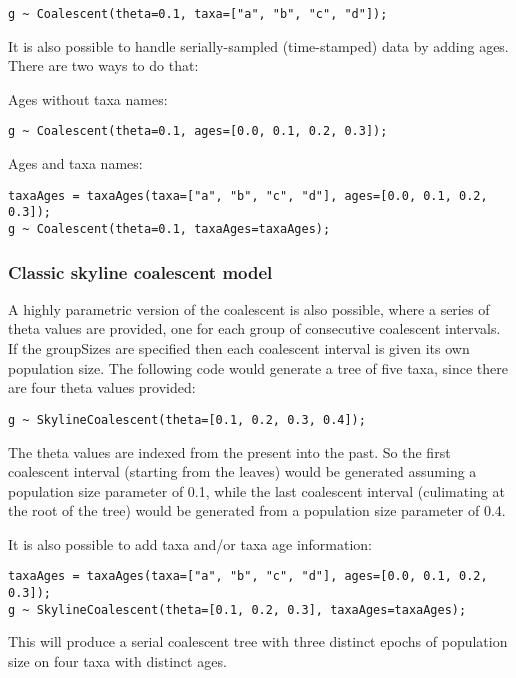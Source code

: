 \documentclass[oneside]{article}
\begin{document}
\begin{verbatim}
g ~ Coalescent(theta=0.1, taxa=["a", "b", "c", "d"]);
\end{verbatim}

It is also possible to handle serially-sampled (time-stamped) data by
adding ages.
There are two ways to do that: 

Ages without taxa names:

\begin{verbatim}
g ~ Coalescent(theta=0.1, ages=[0.0, 0.1, 0.2, 0.3]);
\end{verbatim}

Ages and taxa names:

\begin{verbatim}
taxaAges = taxaAges(taxa=["a", "b", "c", "d"], ages=[0.0, 0.1, 0.2,
0.3]);
g ~ Coalescent(theta=0.1, taxaAges=taxaAges);
\end{verbatim}

\subsubsection{Classic skyline coalescent model}

A highly parametric version of the coalescent is also possible, where
a series of theta values are provided, one for each group of consecutive coalescent intervals.
If the groupSizes are specified then each coalescent interval is given its
own population size.
The following code would generate a tree of five taxa, since there are four theta values provided:

\begin{verbatim}
g ~ SkylineCoalescent(theta=[0.1, 0.2, 0.3, 0.4]);
\end{verbatim}

The theta values are indexed from the present into the past.
So the first coalescent interval (starting from the leaves)
would be generated assuming a population size parameter of 0.1, while
the last coalescent interval (culimating at the root of the tree)
would be generated from a population size parameter of 0.4.

It is also possible to add taxa and/or taxa age information:

\begin{verbatim}
taxaAges = taxaAges(taxa=["a", "b", "c", "d"], ages=[0.0, 0.1, 0.2, 0.3]);
g ~ SkylineCoalescent(theta=[0.1, 0.2, 0.3], taxaAges=taxaAges);
\end{verbatim}

This will produce a serial coalescent tree with three distinct epochs
of population size on four taxa with distinct ages.
\end{document}
